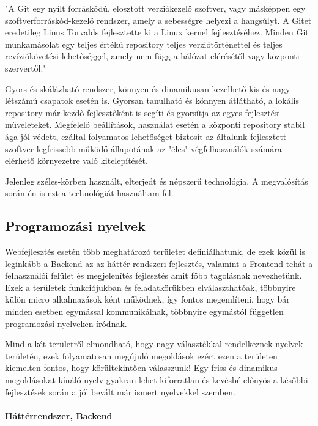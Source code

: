 "A Git egy nyílt forráskódú, elosztott verziókezelő szoftver, vagy másképpen egy szoftverforráskód-kezelő rendszer, amely a sebességre helyezi a hangsúlyt. A Gitet eredetileg Linus Torvalds fejlesztette ki a Linux kernel fejlesztéséhez. Minden Git munkamásolat egy teljes értékű repository teljes verziótörténettel és teljes revíziókövetési lehetőséggel, amely nem függ a hálózat elérésétől vagy központi szervertől."\cite{git}

Gyors és skálázható rendszer, könnyen és dinamikusan kezelhető kis és nagy létszámú csapatok esetén is. Gyorsan tanulható és könnyen átlátható, a lokális repository már kezdő fejlesztőként is segíti és gyorsítja az egyes fejlesztési műveleteket. Megfelelő beállítások, használat esetén a központi repository stabil ága jól védett, ezáltal folyamatos lehetőséget biztosít az általunk fejlesztett szoftver legfrissebb működő állapotának az "éles" végfelhasználók számára elérhető környezetre való kitelepítését.

Jelenleg széles-körben használt, elterjedt és népszerű technológia. A megvalósítás során én is ezt a technológiát használtam fel.

\subsection{Programozási nyelvek}

Webfejlesztés esetén több meghatározó területet definiálhatunk, de ezek közül is leginkább a Backend az-az háttér rendszeri fejlesztés, valamint a Frontend tehát a felhasználói felület és megjelenítés fejlesztés amit főbb tagolásnak nevezhetünk. Ezek a területek funkciójukban és feladatkörükben elválaszthatóak, többnyire külön micro alkalmazások ként működnek, így fontos megemlíteni, hogy bár minden esetben egymással kommunikálnak, többnyire egymástól független programozási nyelveken íródnak.

Mind a két területről elmondható, hogy nagy választékkal rendelkeznek nyelvek területén, ezek folyamatosan megújuló megoldások ezért ezen a területen kiemelten fontos, hogy körültekintően válasszunk! Egy friss és dinamikus megoldásokat kínáló nyelv gyakran lehet kiforratlan és kevésbé előnyös a későbbi fejlesztések során a jól bevált már ismert nyelvekkel szemben.

\paragraph{Háttérrendszer, Backend}

